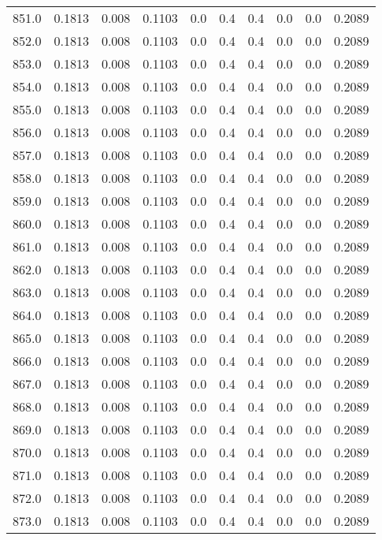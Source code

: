 \begin{longtable}{lrrrrrrrrr}
851.0 & 0.1813 & 0.008 & 0.1103 & 0.0 & 0.4 & 0.4 & 0.0 & 0.0 & 0.2089 \\
852.0 & 0.1813 & 0.008 & 0.1103 & 0.0 & 0.4 & 0.4 & 0.0 & 0.0 & 0.2089 \\
853.0 & 0.1813 & 0.008 & 0.1103 & 0.0 & 0.4 & 0.4 & 0.0 & 0.0 & 0.2089 \\
854.0 & 0.1813 & 0.008 & 0.1103 & 0.0 & 0.4 & 0.4 & 0.0 & 0.0 & 0.2089 \\
855.0 & 0.1813 & 0.008 & 0.1103 & 0.0 & 0.4 & 0.4 & 0.0 & 0.0 & 0.2089 \\
856.0 & 0.1813 & 0.008 & 0.1103 & 0.0 & 0.4 & 0.4 & 0.0 & 0.0 & 0.2089 \\
857.0 & 0.1813 & 0.008 & 0.1103 & 0.0 & 0.4 & 0.4 & 0.0 & 0.0 & 0.2089 \\
858.0 & 0.1813 & 0.008 & 0.1103 & 0.0 & 0.4 & 0.4 & 0.0 & 0.0 & 0.2089 \\
859.0 & 0.1813 & 0.008 & 0.1103 & 0.0 & 0.4 & 0.4 & 0.0 & 0.0 & 0.2089 \\
860.0 & 0.1813 & 0.008 & 0.1103 & 0.0 & 0.4 & 0.4 & 0.0 & 0.0 & 0.2089 \\
861.0 & 0.1813 & 0.008 & 0.1103 & 0.0 & 0.4 & 0.4 & 0.0 & 0.0 & 0.2089 \\
862.0 & 0.1813 & 0.008 & 0.1103 & 0.0 & 0.4 & 0.4 & 0.0 & 0.0 & 0.2089 \\
863.0 & 0.1813 & 0.008 & 0.1103 & 0.0 & 0.4 & 0.4 & 0.0 & 0.0 & 0.2089 \\
864.0 & 0.1813 & 0.008 & 0.1103 & 0.0 & 0.4 & 0.4 & 0.0 & 0.0 & 0.2089 \\
865.0 & 0.1813 & 0.008 & 0.1103 & 0.0 & 0.4 & 0.4 & 0.0 & 0.0 & 0.2089 \\
866.0 & 0.1813 & 0.008 & 0.1103 & 0.0 & 0.4 & 0.4 & 0.0 & 0.0 & 0.2089 \\
867.0 & 0.1813 & 0.008 & 0.1103 & 0.0 & 0.4 & 0.4 & 0.0 & 0.0 & 0.2089 \\
868.0 & 0.1813 & 0.008 & 0.1103 & 0.0 & 0.4 & 0.4 & 0.0 & 0.0 & 0.2089 \\
869.0 & 0.1813 & 0.008 & 0.1103 & 0.0 & 0.4 & 0.4 & 0.0 & 0.0 & 0.2089 \\
870.0 & 0.1813 & 0.008 & 0.1103 & 0.0 & 0.4 & 0.4 & 0.0 & 0.0 & 0.2089 \\
871.0 & 0.1813 & 0.008 & 0.1103 & 0.0 & 0.4 & 0.4 & 0.0 & 0.0 & 0.2089 \\
872.0 & 0.1813 & 0.008 & 0.1103 & 0.0 & 0.4 & 0.4 & 0.0 & 0.0 & 0.2089 \\
873.0 & 0.1813 & 0.008 & 0.1103 & 0.0 & 0.4 & 0.4 & 0.0 & 0.0 & 0.2089 \\

\end{longtable}
